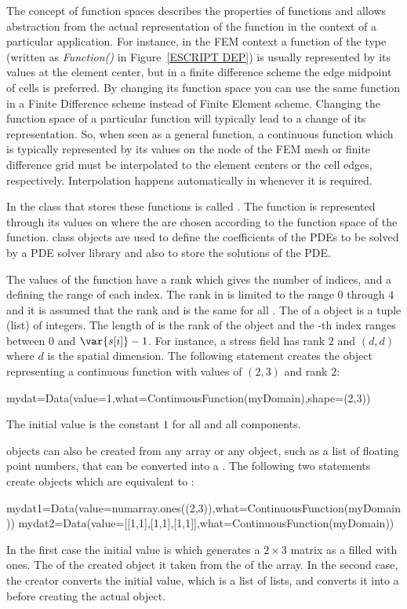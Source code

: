 The concept of function spaces describes the properties of 
functions and allows abstraction from the actual representation 
of the function in the context of a particular application. For instance, 
in the FEM context a
function of the \Function type (written as \emph{Function()} in Figure~\ref{ESCRIPT DEP})
is usually represented by its values at the element center, 
but in a finite difference scheme the edge midpoint of cells is preferred. 
By changing its function space you can use the same function in a Finite Difference
scheme instead of Finite Element scheme.
Changing the function space of a particular function
will typically lead to a change of its representation. 
So, when seen as a general function,
a continuous function which is typically represented by its values
on the node of the FEM mesh or finite difference grid 
must be interpolated to the element centers or the cell edges,
respectively. Interpolation happens automatically in \escript
whenever it is required.

In \escript the class that stores these functions is called \Data.
The function is represented through its values on \DataSamplePoints where
the \DataSamplePoints are chosen according to the function space 
of the function.  
\Data class objects are used to define the coefficients
of the PDEs to be solved by a PDE solver library 
and also to store the solutions of the PDE.

The values of the function have a rank which gives the
number of indices, and a \Shape defining the range of each index.
The rank in \escript is limited to the range $0$ through $4$ and
it is assumed that the rank and \Shape is the same for all \DataSamplePoints.
The \Shape of a \Data object is a tuple (list)  of integers. The length
of  is the rank of the \Data object and the -th index ranges between $0$ and $\var{s[i]}-1$.
For instance, a stress field has rank $2$ and 
\Shape $(d,d)$ where $d$ is the spatial dimension.
The following statement creates the \Data object
 representing a 
continuous function with values 
of \Shape $(2,3)$ and rank $2$:
\begin{python}
  mydat=Data(value=1,what=ContinuousFunction(myDomain),shape=(2,3))
\end{python}
The initial value is the constant $1$ for all \DataSamplePoints and
all components.

\Data objects can also be created from any \numarray
array or any object, such as a list of floating point numbers, 
that can be converted into a \numarrayNA \cite{NUMARRAY}. 
The following two statements
create objects which are equivalent to :
\begin{python}
  mydat1=Data(value=numarray.ones((2,3)),what=ContinuousFunction(myDomain))
  mydat2=Data(value=[[1,1],[1,1],[1,1]],what=ContinuousFunction(myDomain))
\end{python}
In the first case the initial value is 
which generates a $2 \times 3$ matrix as a \numarrayNA 
filled with ones. The \Shape of the created \Data object
it taken from the \Shape of the array. In the second
case, the creator converts the initial value, which is a list of lists,
and converts it into a \numarrayNA before creating the actual
\Data object.      

